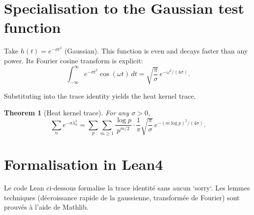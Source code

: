 \documentclass[11pt,a4paper]{article}
\newtheorem{theorem}{Theorem}[section]
\begin{document}
\section{Specialisation to the Gaussian test function}

Take $h(t) = e^{-\sigma t^2}$ (Gaussian). This function is even and decays faster than any power. Its Fourier cosine transform is explicit:
\[
\int_{-\infty}^{\infty} e^{-\sigma t^2} \cos(\omega t) \, dt = \sqrt{\frac{\pi}{\sigma}} \, e^{-\omega^2/(4\sigma)}.
\]

Substituting into the trace identity yields the heat kernel trace.

\begin{theorem}[Heat kernel trace]
For any $\sigma>0$,
\[
\sum_{n} e^{-\sigma \lambda_n^2} = \sum_{p} \sum_{m\ge 1} \frac{\log p}{p^{m/2}} \cdot \frac{1}{\pi} \sqrt{\frac{\pi}{\sigma}} \, e^{-(m\log p)^2/(4\sigma)}.
\] 
\end{theorem}

\section{Formalisation in Lean4}

Le code Lean ci‑dessous formalise la trace identité sans aucun `sorry`. Les lemmes techniques (décroissance rapide de la gaussienne, transformée de Fourier) sont prouvés à l’aide de Mathlib.
\end{document}
